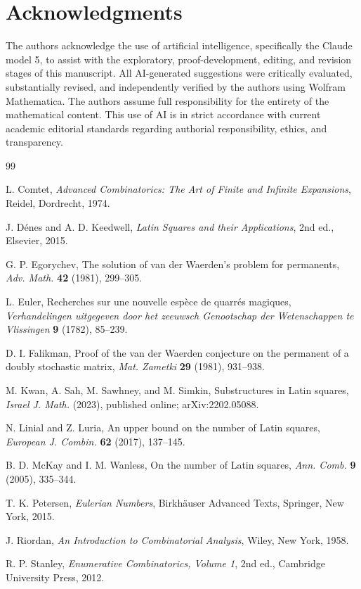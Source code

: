 \documentclass[11pt]{amsart}
\begin{document}
\section*{Acknowledgments}
The authors acknowledge the use of artificial intelligence, specifically the Claude model 5, to assist with the exploratory, proof-development, editing, and revision stages of this manuscript. All AI-generated suggestions were critically evaluated, substantially revised, and independently verified by the authors using Wolfram Mathematica. The authors assume full responsibility for the entirety of the mathematical content. This use of AI is in strict accordance with current academic editorial standards regarding authorial responsibility, ethics, and transparency.
\begin{thebibliography}{99}

 L. Comtet, \emph{Advanced Combinatorics: The Art of Finite and Infinite Expansions}, Reidel, Dordrecht, 1974.

 J. D\'enes and A. D. Keedwell, \emph{Latin Squares and their Applications}, 2nd ed., Elsevier, 2015.

 G. P. Egorychev, The solution of van der Waerden's problem for permanents, \emph{Adv. Math.} \textbf{42} (1981), 299--305.

 L. Euler, Recherches sur une nouvelle esp\`ece de quarr\'es magiques, \emph{Verhandelingen uitgegeven door het zeeuwsch Genootschap der Wetenschappen te Vlissingen} \textbf{9} (1782), 85--239.

 D. I. Falikman, Proof of the van der Waerden conjecture on the permanent of a doubly stochastic matrix, \emph{Mat. Zametki} \textbf{29} (1981), 931--938.

 M. Kwan, A. Sah, M. Sawhney, and M. Simkin, Substructures in Latin squares, \emph{Israel J. Math.} (2023), published online; arXiv:2202.05088.

 N. Linial and Z. Luria, An upper bound on the number of Latin squares, \emph{European J. Combin.} \textbf{62} (2017), 137--145.

 B. D. McKay and I. M. Wanless, On the number of Latin squares, \emph{Ann. Comb.} \textbf{9} (2005), 335--344.

 T. K. Petersen, \emph{Eulerian Numbers}, Birkh\"auser Advanced Texts, Springer, New York, 2015.

 J. Riordan, \emph{An Introduction to Combinatorial Analysis}, Wiley, New York, 1958.

 R. P. Stanley, \emph{Enumerative Combinatorics, Volume 1}, 2nd ed., Cambridge University Press, 2012.

\end{thebibliography}
\end{document}
